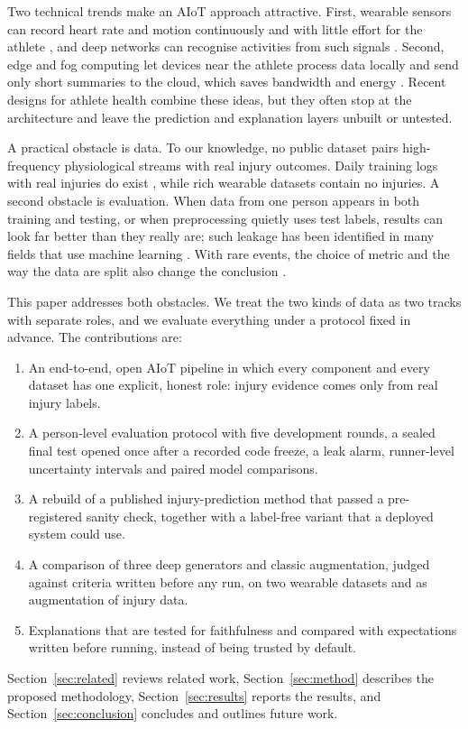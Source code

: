 \documentclass[12pt,a4paper]{article}
\begin{document}
Two technical trends make an AIoT approach attractive. First, wearable sensors can record heart
rate and motion continuously and with little effort for the athlete \citep{caviedes2020,abdalalim2024},
and deep networks can recognise activities from such signals \citep{wang2019,ronao2016}. Second,
edge and fog computing let devices near the athlete process data locally and send only short
summaries to the cloud, which saves bandwidth and energy \citep{cao2021,aazam2018}. Recent
designs for athlete health combine these ideas, but they often stop at the architecture and leave
the prediction and explanation layers unbuilt or untested.

A practical obstacle is data. To our knowledge, no public dataset pairs high-frequency
physiological streams with real injury outcomes. Daily training logs with real injuries do exist
\citep{lovdal2021,lovdal2021data}, while rich wearable datasets
\citep{reiss2012,schmidt2018} contain no injuries. A second obstacle is evaluation. When data from
one person appears in both training and testing, or when preprocessing quietly uses test labels,
results can look far better than they really are; such leakage has been identified in many fields
that use machine learning \citep{kapoor2023}. With rare events, the choice of metric and the
way the data are split also change the conclusion \citep{fawcett2006,he2009,wong2015}.

This paper addresses both obstacles. We treat the two kinds of data as two tracks with separate
roles, and we evaluate everything under a protocol fixed in advance. The contributions are:
\begin{enumerate}
\item An end-to-end, open AIoT pipeline in which every component and every dataset has one
explicit, honest role: injury evidence comes only from real injury labels.
\item A person-level evaluation protocol with five development rounds, a sealed final test
opened once after a recorded code freeze, a leak alarm, runner-level uncertainty intervals and
paired model comparisons.
\item A rebuild of a published injury-prediction method \citep{lovdal2021} that passed a
pre-registered sanity check, together with a label-free variant that a deployed system could use.
\item A comparison of three deep generators and classic augmentation, judged against criteria
written before any run, on two wearable datasets and as augmentation of injury data.
\item Explanations that are tested for faithfulness and compared with expectations written
before running, instead of being trusted by default.
\end{enumerate}
Section~\ref{sec:related} reviews related work, Section~\ref{sec:method} describes the proposed
methodology, Section~\ref{sec:results} reports the results, and Section~\ref{sec:conclusion}
concludes and outlines future work.
\end{document}
